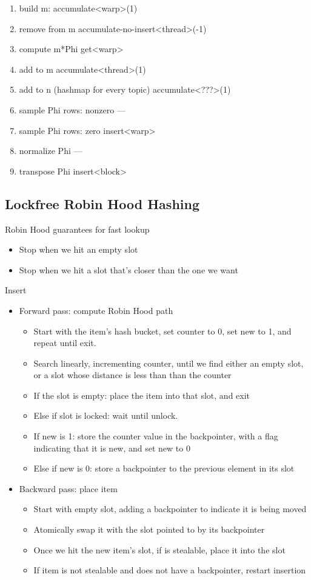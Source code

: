 \documentclass{article}
\begin{document}
\begin{enumerate}
\item build m: 				accumulate<warp>(1)
\item remove from m			accumulate-no-insert<thread>(-1)
\item compute m*Phi			get<warp>
\item add to m				accumulate<thread>(1)
\item add to n (hashmap for every topic)	accumulate<???>(1)
\item sample Phi rows: nonzero		---
\item sample Phi rows: zero		insert<warp>
\item normalize Phi			---
\item transpose Phi			insert<block>
\end{enumerate}

\subsection{Lockfree Robin Hood Hashing}

Robin Hood guarantees for fast lookup
\begin{itemize}
\item Stop when we hit an empty slot
\item Stop when we hit a slot that's closer than the one we want
\end{itemize}

Insert
\begin{itemize}
\item Forward pass: compute Robin Hood path
\begin{itemize}
\item Start with the item's hash bucket, set counter to 0, set new to 1, and repeat until exit.
\item Search linearly, incrementing counter, until we find either an empty slot, or a slot whose distance is less than than the counter
\item If the slot is empty: place the item into that slot, and exit
\item Else if slot is locked: wait until unlock.
\item If new is 1: store the counter value in the backpointer, with a flag indicating that it is new, and set new to 0
\item Else if new is 0: store a backpointer to the previous element in its slot
\end{itemize}
\item Backward pass: place item
\begin{itemize}
\item Start with empty slot, adding a backpointer to indicate it is being moved
\item Atomically swap it with the slot pointed to by its backpointer
\item Once we hit the new item's slot, if is stealable, place it into the slot
\item If item is not stealable and does not have a backpointer, restart insertion
\end{itemize}
\end{itemize}
\end{document}
